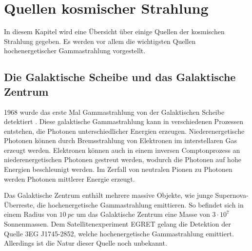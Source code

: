 \section{Quellen kosmischer Strahlung}
\label{sec:Quellen}
In diesem Kapitel wird eine Übersicht über einige Quellen der kosmischen Strahlung gegeben.
Es werden vor allem die wichtigsten Quellen hochenergetischer Gammastrahlung vorgestellt.

\subsection{Die Galaktische Scheibe und das Galaktische Zentrum}
1968 wurde das erste Mal Gammastrahlung von der Galaktischen Scheibe detektiert \cite{GalacticPlane}.
Diese galaktische Gammastrahlung kann in verschiedenen Prozessen entstehen, die Photonen unterschiedlicher Energien erzeugen.
Niederenergetische Photonen können durch Bremsstrahlung von Elektronen im interstellaren Gas erzeugt werden.
Elektronen können auch in einem inversen Comptonprozess an niederenergetischen Photonen gestreut werden, wodurch die Photonen auf hohe Energien beschleunigt werden.
Im Zerfall von neutralen Pionen zu Photonen werden Photonen mittlerer Energie erzeugt.





Das Galaktische Zentrum enthält mehrere massive Objekte, wie junge Supernova-Überreste, die hochenergetische Gammastrahlung emittieren.
So befindet sich in einem Radius von $\SI{10}{pc}$ um das Galaktische Zentrum eine Masse von $3\cdot 10^7$ Sonnenmassen. 
Dem Satellitenexperiment EGRET gelang die Detektion der Quelle 3EG J1745-2852, welche hochenergetische Gammastrahlung emittiert.
Allerdings ist die Natur dieser Quelle noch unbekannt.\cite{GalacticCenter}\cite{Weekes}



